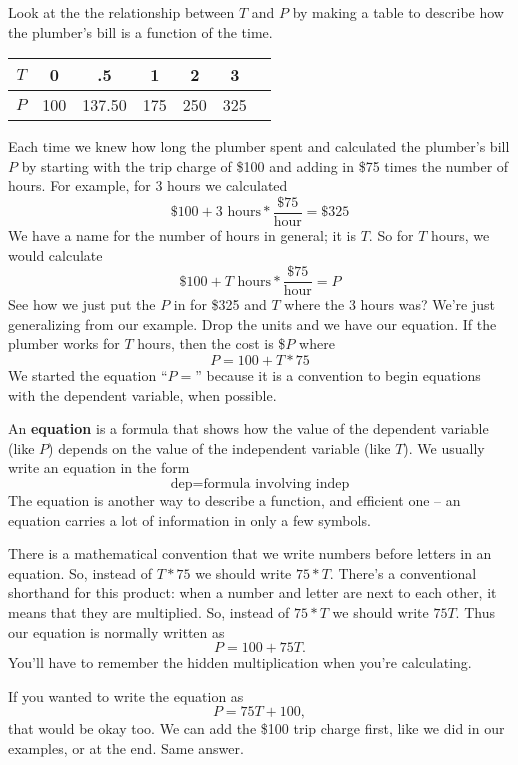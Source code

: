Look at the the relationship between $T$ and $P$ by making a table to describe how the plumber's bill is a function of the time.
\begin{center}
\begin{tabular} {|c| |c |c |c |c |c |c |} \hline
$T$ & 0 & .5 & 1 & 2 & 3 \\ \hline
$P$ & 100 & 137.50 & 175 & 250 & 325 \\ \hline
\end{tabular}
\end{center}

Each time we knew how long the plumber spent and calculated the plumber's bill $P$ by starting with the trip charge of \$100 and adding in \$75 times the number of hours.  For example, for 3 hours we calculated
$$ \$100 + 3 \text{ hours} \ast \frac{\$75}{\text{hour}} = \$325$$
We have a name for the number of hours in general; it is $T$.  So for $T$ hours, we would calculate
 $$\$100 + T \text{ hours} \ast \frac{\$75}{\text{hour}}=P $$  
 See how we just put the $P$ in for \$325 and $T$ where the 3 hours was?  We're just generalizing from our example.  Drop the units and we have our equation.  If the plumber works for $T$ hours, then the cost is \$$P$ where 
 $$P = 100 + T \ast 75$$  
 We started the equation ``$P=$'' because it is a convention to begin equations with the dependent variable, when possible.
 
 An \textbf{equation} is a formula that shows how the value of the dependent variable (like $P$) depends on the value of the independent variable (like $T$).  We usually write an equation in the form 
$$\text{dep} = \text{formula involving indep}$$
The equation is another way to describe a function, and efficient one --  an equation carries a lot of information in only a few symbols.

There is a mathematical convention that we write numbers before letters in an equation. So, instead of $T \ast 75$ we should write $75 \ast T$.  There's a conventional shorthand for this product:  when a number and letter are next to each other, it means that they are multiplied.  So, instead of $75 * T$ we should write $75T$. Thus our equation is normally written as $$P = 100 + 75T.$$  You'll have to remember the hidden multiplication when you're calculating.  

If you wanted to write the equation as $$P = 75T + 100,$$ that would be okay too.  We can add the \$100 trip charge first, like we did in our examples, or at the end.  Same answer.

